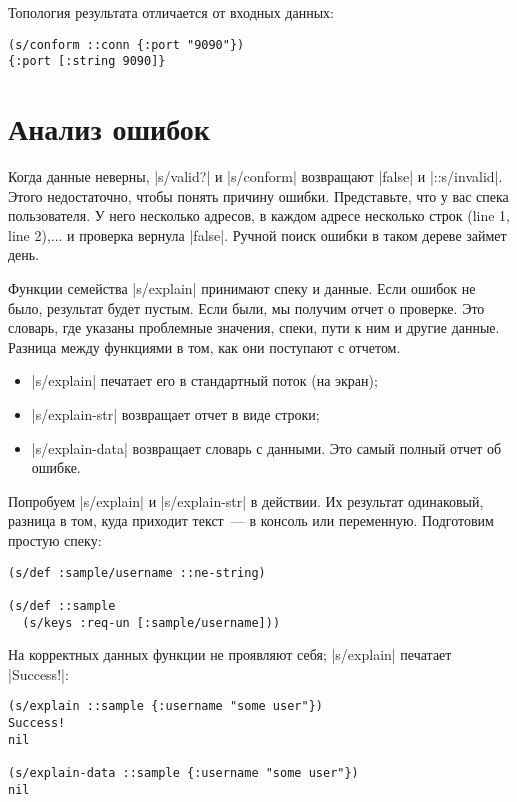 Топология результата отличается от входных данных:

\begin{verbatim}
(s/conform ::conn {:port "9090"})
{:port [:string 9090]}
\end{verbatim}

\section{Анализ ошибок}

Когда данные неверны, \spverb|s/valid?| и \spverb|s/conform| возвращают
\spverb|false| и \spverb|::s/invalid|. Этого недостаточно, чтобы понять причину
ошибки. Представьте, что у вас спека пользователя. У него несколько адресов, в
каждом адресе несколько строк (line 1, line 2),... и проверка вернула \spverb|false|.
Ручной поиск ошибки в таком дереве займет день.

Функции семейства \spverb|s/explain| принимают спеку и данные. Если ошибок не
было, результат будет пустым. Если были, мы получим отчет о проверке. Это
словарь, где указаны проблемные значения, спеки, пути к ним и другие
данные. Разница между функциями в том, как они поступают с отчетом.

\begin{itemize}

\item
  \spverb|s/explain| печатает его в стандартный поток (на экран);

\item
  \spverb|s/explain-str| возвращает отчет в виде строки;

\item
  \spverb|s/explain-data| возвращает словарь с данными. Это самый полный отчет
  об ошибке.

\end{itemize}

Попробуем \spverb|s/explain| и \spverb|s/explain-str| в действии. Их результат
одинаковый, разница в том, куда приходит текст~--- в консоль или переменную.
Подготовим простую спеку:

\begin{verbatim}
(s/def :sample/username ::ne-string)

(s/def ::sample
  (s/keys :req-un [:sample/username]))
\end{verbatim}

На корректных данных функции не проявляют себя; \spverb|s/explain| печатает
\spverb|Success!|:

\begin{verbatim}
(s/explain ::sample {:username "some user"})
Success!
nil

(s/explain-data ::sample {:username "some user"})
nil
\end{verbatim}

